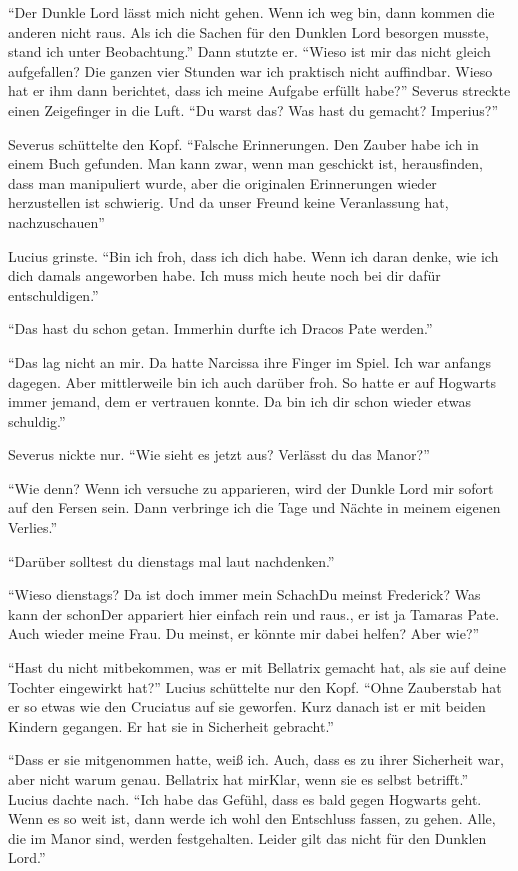 \enquote{Der Dunkle Lord lässt mich nicht gehen. Wenn ich weg bin, dann kommen die anderen nicht raus. Als ich die Sachen für den Dunklen Lord besorgen musste, stand ich unter Beobachtung.} Dann stutzte er. \enquote{Wieso ist mir das nicht gleich aufgefallen? Die ganzen vier Stunden war ich praktisch nicht auffindbar. Wieso hat er ihm dann berichtet, dass ich meine Aufgabe erfüllt habe?} Severus streckte einen Zeigefinger in die Luft. \enquote{Du warst das? Was hast du gemacht? Imperius?}

Severus schüttelte den Kopf. \enquote{Falsche Erinnerungen. Den Zauber habe ich in einem Buch gefunden. Man kann zwar, wenn man geschickt ist, herausfinden, dass man manipuliert wurde, aber die originalen Erinnerungen wieder herzustellen ist schwierig. Und da unser Freund keine Veranlassung hat, nachzuschauen\abs}

Lucius grinste. \enquote{Bin ich froh, dass ich dich habe. Wenn ich daran denke, wie ich dich damals angeworben habe. Ich muss mich heute noch bei dir dafür entschuldigen.}

\enquote{Das hast du schon getan. Immerhin durfte ich Dracos Pate werden.}

\enquote{Das lag nicht an mir. Da hatte Narcissa ihre Finger im Spiel. Ich war anfangs dagegen. Aber mittlerweile bin ich auch darüber froh. So hatte er auf Hogwarts immer jemand, dem er vertrauen konnte. Da bin ich dir schon wieder etwas schuldig.}

Severus nickte nur. \enquote{Wie sieht es jetzt aus? Verlässt du das Manor?}

\enquote{Wie denn? Wenn ich versuche zu apparieren, wird der Dunkle Lord mir sofort auf den Fersen sein. Dann verbringe ich die Tage und Nächte in meinem eigenen Verlies.}

\enquote{Darüber solltest du dienstags mal laut nachdenken.}

\enquote{Wieso dienstags? Da ist doch immer mein Schach\aabs Du meinst Frederick? Was kann der schon\abs Der appariert hier einfach rein und raus., er ist ja Tamaras Pate. Auch wieder meine Frau. Du meinst, er könnte mir dabei helfen? Aber wie?}

\enquote{Hast du nicht mitbekommen, was er mit Bellatrix gemacht hat, als sie auf deine Tochter eingewirkt hat?} Lucius schüttelte nur den Kopf. \enquote{Ohne Zauberstab hat er so etwas wie den Cruciatus auf sie geworfen. Kurz danach ist er mit beiden Kindern gegangen. Er hat sie in Sicherheit gebracht.}

\enquote{Dass er sie mitgenommen hatte, weiß ich. Auch, dass es zu ihrer Sicherheit war, aber nicht warum genau. Bellatrix hat mir\abs Klar, wenn sie es selbst betrifft.} Lucius dachte nach. \enquote{Ich habe das Gefühl, dass es bald gegen Hogwarts geht. Wenn es so weit ist, dann werde ich wohl den Entschluss fassen, zu gehen. Alle, die im Manor sind, werden festgehalten. Leider gilt das nicht für den Dunklen Lord.}

